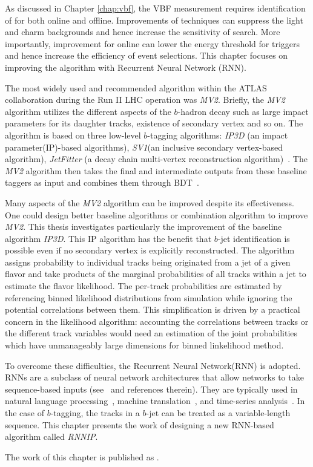 As discussed in Chapter \ref{chap:vbf}, the VBF \Hbb measurement requires identification of \bjets for both online and offline. Improvements of \btagging techniques can suppress the light and charm backgrounds and hence increase the sensitivity of \Hbb search. More importantly, improvement for online \btagging can lower the energy threshold for \bjet triggers and hence increase the efficiency of \Hbb event selections. This chapter focuses on improving the \btagging algorithm with Recurrent Neural Network (RNN). 

The most widely used and recommended \btagging algorithm within the ATLAS collaboration during the Run II LHC operation was \textit{MV2}. Briefly, the \textit{MV2} algorithm utilizes the different aspects of the $b$-hadron decay such as large impact parameters for its daughter tracks, existence of secondary vertex and so on. The algorithm is based on three low-level $b$-tagging algorithms: \textit{IP3D} (an impact parameter(IP)-based algorithms), \textit{SV1}(an inclusive secondary vertex-based algorithm), \textit{JetFitter} (a decay chain multi-vertex reconstruction algorithm)~\cite{ref:btagPaper}. The \textit{MV2} algorithm then takes the final and intermediate outputs from these baseline taggers as input and combines them through BDT~\cite{ATL-PHYS-PUB-2016-012}.

Many aspects of the \textit{MV2} algorithm can be improved despite its effectiveness. One could design better baseline algorithms or combination algorithm to improve \textit{MV2}. This thesis investigates particularly the improvement of the baseline algorithm \textit{IP3D}. This IP algorithm has the benefit that $b$-jet identification is possible even if no secondary vertex is explicitly reconstructed. The algorithm assigns probability to individual tracks being originated from a jet of a given flavor and take products of the marginal probabilities of all tracks within a jet to estimate the flavor likelihood. The per-track probabilities are estimated by referencing binned likelihood distributions from simulation while ignoring the potential correlations between them. This simplification is driven by a practical concern in the likelihood algorithm: accounting the correlations between tracks or the different track variables would need an estimation of the joint probabilities which have unmanageably large dimensions for binned linkelihood method.

To overcome these difficulties, the Recurrent Neural Network(RNN) is adopted. RNNs are a subclass of neural network architectures that allow networks to take sequence-based inputs (see~\cite{ref:RNNthesis} and references therein). They are typically used in natural language processing~\cite{languagemodel,DBLP:journals/corr/abs-1303-5778}, machine translation~\cite{MT,MT2}, and time-series analysis~\cite{timeseries,timeseries2}. In the case of $b$-tagging, the tracks in a $b$-jet can be treated as a variable-length sequence. This chapter presents the work of designing a new RNN-based \btagging algorithm called \textit{RNNIP}.

The work of this chapter is published as \cite{ATL-PHYS-PUB-2017-003}. 
